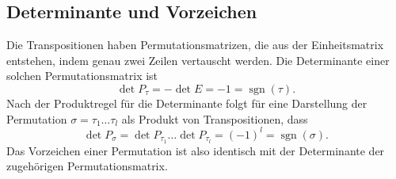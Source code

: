 \subsection{Determinante und Vorzeichen}
Die Transpositionen haben Permutationsmatrizen, die aus der Einheitsmatrix
entstehen, indem genau zwei Zeilen vertauscht werden.
Die Determinante einer solchen Permutationsmatrix ist
\[
\det P_{\tau} = - \det E = -1 = \operatorname{sgn}(\tau).
\]
Nach der Produktregel für die Determinante folgt für eine Darstellung
der Permutation $\sigma=\tau_1\dots\tau_l$ als Produkt von Transpositionen,
dass
\begin{equation}
\det P_{\sigma}
=
\det P_{\tau_1} \dots \det P_{\tau_l}
=
(-1)^l
=
\operatorname{sgn}(\sigma).
\label{buch:permutationen:determinante}
\end{equation}
Das Vorzeichen einer Permutation ist also identisch mit der Determinante
der zugehörigen Permutationsmatrix.



